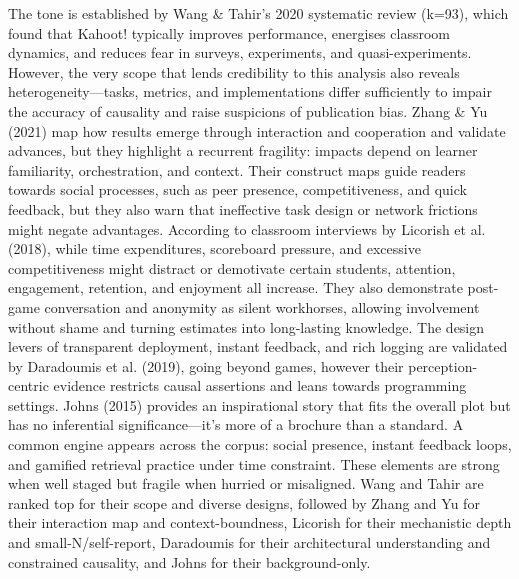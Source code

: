  The tone is established by Wang & Tahir's 2020 systematic review\cite{WangTahir2020KahootReview} (k=93), which found that Kahoot! typically improves performance, energises classroom dynamics, and reduces fear in surveys, experiments, and quasi-experiments.
 However, the very scope that lends credibility to this analysis also reveals heterogeneity—tasks, metrics, and implementations differ sufficiently to impair the accuracy of causality and raise suspicions of publication bias.
 Zhang & Yu (2021)\cite{ZhangYu2021KahootEIT} map how results emerge through interaction and cooperation and validate advances, but they highlight a recurrent fragility: impacts depend on learner familiarity, orchestration, and context.
 Their construct maps guide readers towards social processes, such as peer presence, competitiveness, and quick feedback, but they also warn that ineffective task design or network frictions might negate advantages.
 According to classroom interviews by Licorish et al. (2018)\cite{Licorish2018RPTEL}, while time expenditures, scoreboard pressure, and excessive competitiveness might distract or demotivate certain students, attention, engagement, retention, and enjoyment all increase.
 They also demonstrate post-game conversation and anonymity as silent workhorses, allowing involvement without shame and turning estimates into long-lasting knowledge.
 The design levers of transparent deployment, instant feedback, and rich logging are validated by Daradoumis et al. (2019)\cite{Daradoumis2019CompEduc}, going beyond games, however their perception-centric evidence restricts causal assertions and leans towards programming settings.
 Johns (2015)\cite{Johns2015DKG} provides an inspirational story that fits the overall plot but has no inferential significance—it's more of a brochure than a standard.
 A common engine appears across the corpus: social presence, instant feedback loops, and gamified retrieval practice under time constraint. These elements are strong when well staged but fragile when hurried or misaligned.
 Wang and Tahir are ranked top for their scope and diverse designs, followed by Zhang and Yu for their interaction map and context-boundness, Licorish for their mechanistic depth and small-N/self-report, Daradoumis for their architectural understanding and constrained causality, and Johns for their background-only.
 
